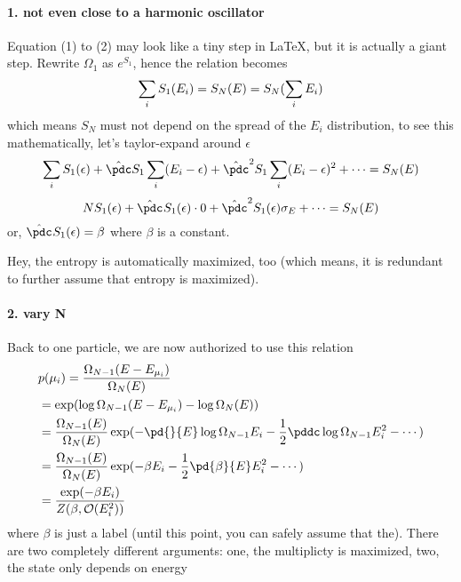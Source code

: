         \paragraph{1. not even close to a harmonic oscillator}
        Equation (1) to (2) may look like a tiny step in \LaTeX, but it is actually a giant step.
        Rewrite $\Omega_1$ as $e^{ S_1}$, hence the relation becomes
\[
            \sum_i S_1(E_i) = S_N(E) = S_N(\sum_i E_i) \\
            \]
        \newcommand{\aE}{\epsilon}
        which means $S_N$ must not depend on the spread of the $E_i$ distribution, to see this mathematically, let's taylor-expand around $\aE$
        \newcommand{\soi}{\sum_i}
        \newcommand{\Stothei}[1] {{\hat\pdc}^{#1} S_1(\aE)}
        \[ \soi S_1(\aE) +  \hat\pdc S_1 \soi(E_i-\aE) +  {\hat\pdc}^2 S_1 \soi (E_i-\aE)^2 + \cdots  = S_N(E) \]
        \[ NS_1(\aE) + \Stothei{} \cdot 0 + \Stothei{2}\sigma_E + \cdots = S_N(E)   \]
        or, $\Stothei{}=\beta$ where $\beta$ is a constant.

        Hey, the entropy is automatically maximized, too (which means, it is redundant to further assume that entropy is maximized).

        \paragraph{2. vary N}
        




        Back to one particle, we are now authorized to use this relation
        \begin{align*}
            &p(\mu_i) = \frac{\Omega_{N -1}(E-E_{\mu_i})}{\Omega_N(E)} \\
            &= \exp(\log\Omega_{N-1}(E-E_{\mu_i}) - \log \Omega_N(E))\\
            & = \frac{\Omega_{N-1}( E )}{\Omega_N(E)} \exp(-\pd{}{E}\log \Omega_{N-1}E_i - \frac{1}{2}\pddc \log\Omega_{N-1}E_i^2 - \cdots  )\\
            & = \frac{\Omega_{N-1}( E )}{\Omega_N(E)} \exp(-\beta E_i -\frac12 \pd{\beta}{E} E_i^2 - \cdots  )\\
            & = \frac{\exp(-\beta E_i)}{Z(\beta,\mathcal{O}(E_i^2))}\\ 
        \end{align*}
        where $\beta$ is just a label (until this point, you can safely assume that the). There are two completely different arguments: one, the multiplicty is maximized, two, the state only depends on energy

